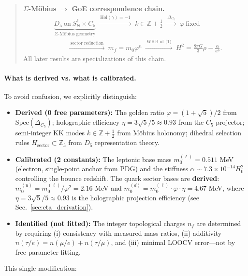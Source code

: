 \documentclass[12pt]{article}
\begin{document}
\begin{quote}
\textbf{$\Sigma$-M\"obius $\Rightarrow$ GoE correspondence chain.}
\begin{align*}
&\underbrace{D_5\ \text{on}\ S^1_\Theta \times C_5}_{\text{$\Sigma$-M\"obius geometry}}
\ \xrightarrow{\ \text{Hol}(\gamma)=-1\ }\ 
k \in \mathbb{Z}+\tfrac{1}{2}
\ \xrightarrow{\ \Delta_{C_5}\ }\ 
\varphi\ \text{fixed} \\
&\qquad \xrightarrow{\ \text{sector reduction}\ }\ 
m_f=m_0\varphi^n
\ \xrightarrow{\ \text{WKB of (1)}\ }\ 
H^2=\tfrac{8\pi G}{3}\rho-\tfrac{\alpha}{a^6}.
\end{align*}
All later results are specializations of this chain.
\end{quote}

\paragraph{What is derived vs. what is calibrated.}
To avoid confusion, we explicitly distinguish:
\begin{itemize}
\item \textbf{Derived (0 free parameters):} The golden ratio $\varphi = (1+\sqrt{5})/2$ from $\mathrm{Spec}(\Delta_{C_5})$; holographic efficiency $\eta = 3\sqrt{5}/5 \approx 0.93$ from the $C_5$ projector; semi-integer KK modes $k \in \mathbb{Z}+\tfrac{1}{2}$ from M\"obius holonomy; dihedral selection rules $H_{\text{sector}} \subset \mathbb{Z}_5$ from $D_5$ representation theory.

\item \textbf{Calibrated (2 constants):} The leptonic base mass $m_0^{(\ell)} = 0.511$ MeV (electron, single-point anchor from PDG) and the stiffness $\alpha \sim 7.3 \times 10^{-14} H_0^2$ controlling the bounce redshift. The quark sector bases are \textbf{derived}: $m_0^{(u)} = m_0^{(\ell)}/\varphi^2 = 2.16$ MeV and $m_0^{(d)} = m_0^{(\ell)} \cdot \varphi \cdot \eta = 4.67$ MeV, where $\eta = 3\sqrt{5}/5 \approx 0.93$ is the holographic projection efficiency (see Sec.~\ref{sec:eta_derivation}).

\item \textbf{Identified (not fitted):} The integer topological charges $n_f$ are determined by requiring (i) consistency with measured mass ratios, (ii) additivity $n(\tau/e) = n(\mu/e) + n(\tau/\mu)$, and (iii) minimal LOOCV error—not by free parameter fitting.
\end{itemize}

This single modification:
\end{document}
